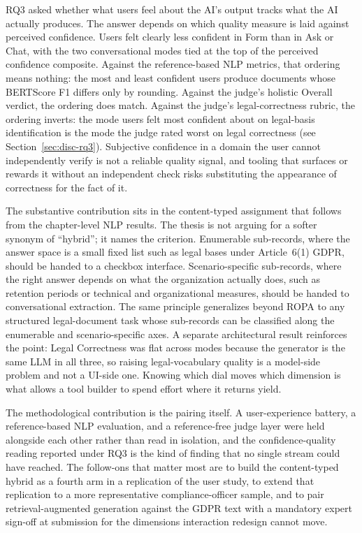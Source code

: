 RQ3 asked whether what users feel about the AI's output
tracks what the AI actually produces. The answer depends on
which quality measure is laid against perceived confidence.
Users felt clearly less confident in Form than in Ask or
Chat, with the two conversational modes tied at the top of
the perceived confidence composite. Against the
reference-based NLP metrics, that ordering means nothing: the
most and least confident users produce documents whose
BERTScore F1 differs only by rounding. Against the judge's
holistic Overall verdict, the ordering does match. Against
the judge's legal-correctness rubric, the ordering inverts:
the mode users felt most confident about on legal-basis
identification is the mode the judge rated worst on legal
correctness (see Section~\ref{sec:disc-rq3}). Subjective
confidence in a domain the user cannot independently verify
is not a reliable quality signal, and tooling that surfaces
or rewards it without an independent check risks substituting
the appearance of correctness for the fact of it.


The substantive contribution sits in the content-typed
assignment that follows from the chapter-level NLP results.
The thesis is not arguing for a softer synonym of
``hybrid''; it names the criterion. Enumerable sub-records,
where the answer space is a small fixed list such as legal
bases under Article~6(1) GDPR, should be handed to a
checkbox interface. Scenario-specific sub-records, where the
right answer depends on what the organization actually does,
such as retention periods or technical and organizational
measures, should be handed to conversational extraction. The
same principle generalizes beyond ROPA to any structured
legal-document task whose sub-records can be classified along
the enumerable and scenario-specific axes. A separate
architectural result reinforces the point: Legal Correctness
was flat across modes because the generator is the same LLM
in all three, so raising legal-vocabulary quality is a
model-side problem and not a UI-side one. Knowing which dial
moves which dimension is what allows a tool builder to spend
effort where it returns yield.

The methodological contribution is the pairing itself. A
user-experience battery, a reference-based NLP evaluation,
and a reference-free judge layer were held alongside each
other rather than read in isolation, and the
confidence-quality reading reported under RQ3 is the kind of
finding that no single stream could have reached. The
follow-ons that matter most are to build the content-typed
hybrid as a fourth arm in a replication of the user study, to
extend that replication to a more representative
compliance-officer sample, and to pair retrieval-augmented
generation against the GDPR text with a mandatory expert
sign-off at submission for the dimensions interaction
redesign cannot move.


